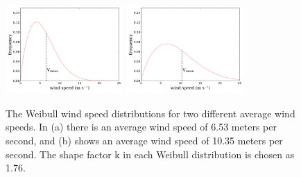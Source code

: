 
\begin{figure}[htbp]
  \centering
  \includegraphics[width=0.4\textwidth]{Figures/weibull_6_53.pdf}\label{653}
  \includegraphics[width=0.4\textwidth]{Figures/weibull_10_35.pdf}\label{1035}
  \caption{\label{weibull} The Weibull wind speed distributions for two different average wind speeds. In (a) there is an average wind speed of 6.53 meters per second, and (b) shows an average wind speed of 10.35 meters per second. The shape factor k in each Weibull distribution is chosen as 1.76.}
\end{figure}



